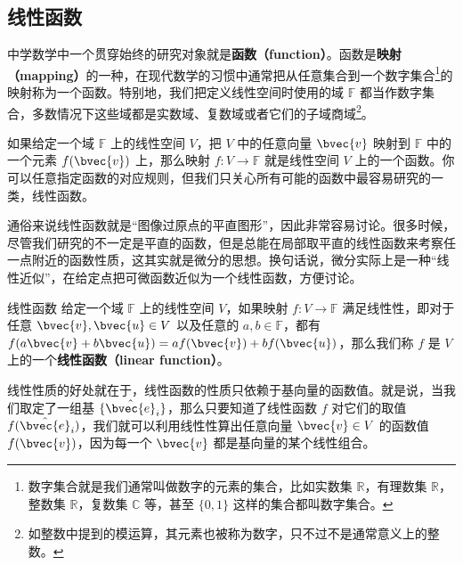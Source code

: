 


\subsection{线性函数}

中学数学中一个贯穿始终的研究对象就是\textbf{函数（function）}。函数是\textbf{映射（mapping）}的一种，在现代数学的习惯中通常把从任意集合到一个数字集合\footnote{数字集合就是我们通常叫做数字的元素的集合，比如实数集 $\mathbb{R}$，有理数集 $\mathbb{R}$，整数集 $\mathbb{R}$，复数集 $\mathbb{C}$ 等，甚至 $\{0, 1\}$ 这样的集合都叫数字集合。}的映射称为一个函数。特别地，我们把定义线性空间时使用的域 $\mathbb{F}$ 都当作数字集合，多数情况下这些域都是实数域、复数域或者它们的子域商域\footnote{如整数中提到的模运算，其元素也被称为数字，只不过不是通常意义上的整数。}。

如果给定一个域 $\mathbb{F}$ 上的线性空间 $V$，把 $V$ 中的任意向量 $\bvec{v}$ 映射到 $\mathbb{F}$ 中的一个元素 $f(\bvec{v})$ 上，那么映射 $f:V\rightarrow\mathbb{F}$ 就是线性空间 $V$ 上的一个函数。你可以任意指定函数的对应规则，但我们只关心所有可能的函数中最容易研究的一类，线性函数。

通俗来说线性函数就是“图像过原点的平直图形”，因此非常容易讨论。很多时候，尽管我们研究的不一定是平直的函数，但是总能在局部取平直的线性函数来考察任一点附近的函数性质，这其实就是微分的思想。换句话说，微分实际上是一种“线性近似”，在给定点把可微函数近似为一个线性函数，方便讨论。

\begin{definition}{线性函数}\label{def_DualSp_3}
给定一个域 $\mathbb{F}$ 上的线性空间 $V$，如果映射 $f:V\rightarrow\mathbb{F}$ 满足线性性，即对于任意 $\bvec{v}, \bvec{u}\in V$ 以及任意的 $a, b\in\mathbb{F}$，都有 $f(a\bvec{v}+b\bvec{u})=af(\bvec{v})+bf(\bvec{u})$，那么我们称 $f$ 是 $V$ 上的一个\textbf{线性函数（linear function）}。
\end{definition}

线性性质的好处就在于，线性函数的性质只依赖于基向量的函数值。就是说，当我们取定了一组基 $\{\hat{\bvec{e}}_i\}$，那么只要知道了线性函数 $f$ 对它们的取值 $f(\hat{\bvec{e}}_i)$，我们就可以利用线性性算出任意向量 $\bvec{v}\in V$ 的函数值 $f(\bvec{v})$，因为每一个 $\bvec{v}$ 都是基向量的某个线性组合。

